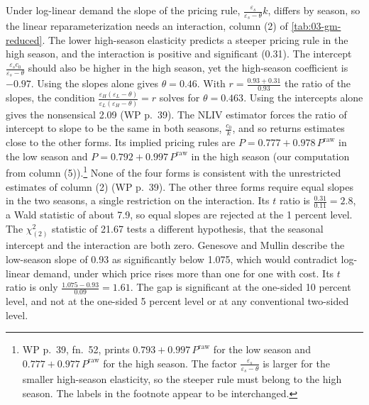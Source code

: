 Under log-linear demand the slope of the pricing rule, $\frac{\varepsilon_s}{\varepsilon_s - \theta}k$,
differs by season, so the linear reparameterization needs an interaction, column (2) of
\cref{tab:03-gm-reduced}. The lower high-season elasticity predicts a steeper pricing rule in the high
season, and the interaction is positive and significant (0.31). The intercept $\frac{\varepsilon_s c_0}
{\varepsilon_s - \theta}$ should also be higher in the high season, yet the high-season coefficient is
$-0.97$. Using the slopes alone gives $\theta = 0.46$. With $r = \frac{0.93 + 0.31}{0.93}$ the ratio of the
slopes, the condition $\frac{\varepsilon_H(\varepsilon_L - \theta)}{\varepsilon_L(\varepsilon_H - \theta)} = r$
solves for $\theta = 0.463$. Using the intercepts alone gives the nonsensical 2.09 (WP p.~39). The NLIV
estimator forces the ratio of intercept to slope to be the same in both seasons, $\frac{c_0}{k}$, and so
returns estimates close to the other forms. Its implied pricing rules are $P = 0.777 + 0.978\,P^{\mathrm{raw}}$
in the low season and $P = 0.792 + 0.997\,P^{\mathrm{raw}}$ in the high season (our computation from column
(5)).\footnote{WP p.~39, fn.~52, prints $0.793 + 0.997\,P^{\mathrm{raw}}$ for the low season and $0.777 + 0.977\,
P^{\mathrm{raw}}$ for the high season. The factor $\frac{\varepsilon_s}{\varepsilon_s - \theta}$ is larger for the
smaller high-season elasticity, so the steeper rule must belong to the high season. The labels in the footnote
appear to be interchanged.} None of the four forms is consistent with the unrestricted estimates of column (2)
(WP p.~39). The other three forms require equal slopes in the two seasons, a single restriction on the
interaction. Its $t$ ratio is $\frac{0.31}{0.11} = 2.8$, a Wald statistic of about 7.9, so equal slopes are
rejected at the 1 percent level. The $\chi^2_{(2)}$ statistic of 21.67 tests a different hypothesis, that
the seasonal intercept and the interaction are both zero. Genesove and Mullin describe the low-season slope of
0.93 as significantly below 1.075, which would contradict log-linear demand, under which price rises more than
one for one with cost. Its $t$ ratio is only $\frac{1.075 - 0.93}{0.09} = 1.61$. The gap is significant at
the one-sided 10 percent level, and not at the one-sided 5 percent level or at any conventional two-sided level.

